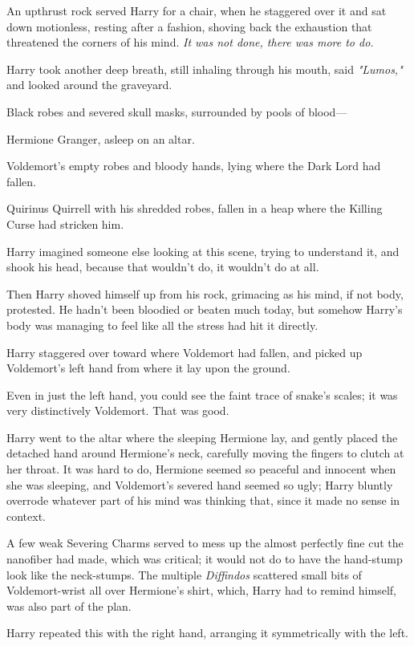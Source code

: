 An upthrust rock served Harry for a chair, when he staggered over it and sat
down motionless, resting after a fashion, shoving back the exhaustion that
threatened the corners of his mind. \emph{It was not done, there was more to
do.}

Harry took another deep breath, still inhaling through his mouth, said
\emph{"Lumos,"} and looked around the graveyard.

Black robes and severed skull masks, surrounded by pools of blood---

Hermione Granger, asleep on an altar.

Voldemort's empty robes and bloody hands, lying where the Dark Lord had fallen.

Quirinus Quirrell with his shredded robes, fallen in a heap where the Killing
Curse had stricken him.

Harry imagined someone else looking at this scene, trying to understand it, and
shook his head, because that wouldn't do, it wouldn't do at all.

Then Harry shoved himself up from his rock, grimacing as his mind, if not body,
protested. He hadn't been bloodied or beaten much today, but somehow Harry's
body was managing to feel like all the stress had hit it directly.

Harry staggered over toward where Voldemort had fallen, and picked up
Voldemort's left hand from where it lay upon the ground.

Even in just the left hand, you could see the faint trace of snake's scales; it
was very distinctively Voldemort. That was good.

Harry went to the altar where the sleeping Hermione lay, and gently placed the
detached hand around Hermione's neck, carefully moving the fingers to clutch at
her throat. It was hard to do, Hermione seemed so peaceful and innocent when
she was sleeping, and Voldemort's severed hand seemed so ugly; Harry bluntly
overrode whatever part of his mind was thinking that, since it made no sense in
context.

A few weak Severing Charms served to mess up the almost perfectly fine cut the
nanofiber had made, which was critical; it would not do to have the hand-stump
look like the neck-stumps. The multiple \emph{Diffindos} scattered small bits
of Voldemort-wrist all over Hermione's shirt, which, Harry had to remind
himself, was also part of the plan.

Harry repeated this with the right hand, arranging it symmetrically with the
left.

